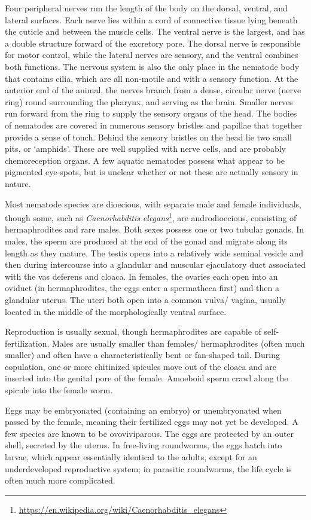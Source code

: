 \documentclass[]{book}
\let\rmarkdownfootnote\footnote%
\def\footnote{\protect\rmarkdownfootnote}
\renewcommand{\href}[2]{#2\footnote{\url{#1}}}
\theoremstyle{definition}
\theoremstyle{definition}
\theoremstyle{definition}
\theoremstyle{remark}
\begin{document}
Four peripheral nerves run the length of the body on the dorsal,
ventral, and lateral surfaces. Each nerve lies within a cord of
connective tissue lying beneath the cuticle and between the muscle
cells. The ventral nerve is the largest, and has a double structure
forward of the excretory pore. The dorsal nerve is responsible for motor
control, while the lateral nerves are sensory, and the ventral combines
both functions. The nervous system is also the only place in the
nematode body that contains cilia, which are all non-motile and with a
sensory function. At the anterior end of the animal, the nerves branch
from a dense, circular nerve (nerve ring) round surrounding the pharynx,
and serving as the brain. Smaller nerves run forward from the ring to
supply the sensory organs of the head. The bodies of nematodes are
covered in numerous sensory bristles and papillae that together provide
a sense of touch. Behind the sensory bristles on the head lie two small
pits, or `amphids'. These are well supplied with nerve cells, and are
probably chemoreception organs. A few aquatic nematodes possess what
appear to be pigmented eye-spots, but is unclear whether or not these
are actually sensory in nature.

Most nematode species are dioecious, with separate male and female
individuals, though some, such as
\href{https://en.wikipedia.org/wiki/Caenorhabditis_elegans}{\emph{Caenorhabditis
elegans}}, are androdioecious, consisting of hermaphrodites and rare
males. Both sexes possess one or two tubular gonads. In males, the sperm
are produced at the end of the gonad and migrate along its length as
they mature. The testis opens into a relatively wide seminal vesicle and
then during intercourse into a glandular and muscular ejaculatory duct
associated with the vas deferens and cloaca. In females, the ovaries
each open into an oviduct (in hermaphrodites, the eggs enter a
spermatheca first) and then a glandular uterus. The uteri both open into
a common vulva/ vagina, usually located in the middle of the
morphologically ventral surface.

Reproduction is usually sexual, though hermaphrodites are capable of
self-fertilization. Males are usually smaller than females/
hermaphrodites (often much smaller) and often have a characteristically
bent or fan-shaped tail. During copulation, one or more chitinized
spicules move out of the cloaca and are inserted into the genital pore
of the female. Amoeboid sperm crawl along the spicule into the female
worm.

Eggs may be embryonated (containing an embryo) or unembryonated when
passed by the female, meaning their fertilized eggs may not yet be
developed. A few species are known to be ovoviviparous. The eggs are
protected by an outer shell, secreted by the uterus. In free-living
roundworms, the eggs hatch into larvae, which appear essentially
identical to the adults, except for an underdeveloped reproductive
system; in parasitic roundworms, the life cycle is often much more
complicated.
\end{document}
